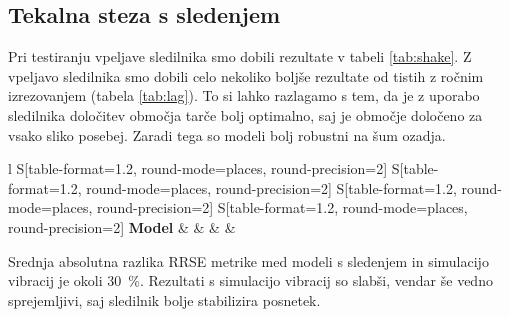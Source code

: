 \subsection{Tekalna steza s sledenjem}
Pri testiranju vpeljave sledilnika smo dobili rezultate v tabeli \ref{tab:shake}. Z vpeljavo sledilnika smo dobili celo nekoliko boljše rezultate od tistih z ročnim izrezovanjem (tabela \ref{tab:lag}). To si lahko razlagamo s tem, da je z uporabo sledilnika določitev območja tarče bolj optimalno, saj je območje določeno za vsako sliko posebej. Zaradi tega so modeli bolj robustni na šum ozadja.




\begin{table}[!htbp]
	\centering
	\begin{tabular}{l S[table-format=1.2, round-mode=places, round-precision=2] S[table-format=1.2, round-mode=places, round-precision=2] S[table-format=1.2, round-mode=places, round-precision=2] S[table-format=1.2, round-mode=places, round-precision=2]}
		\toprule
		\textbf{Model} &  &  &  &  \\
		\midrule
		\bottomrule
	\end{tabular}
	\caption[Rezultati tekalne steze s sledenjem]{Rezultati tekalne steze s sledenjem. Pri modelih s \textit{sh} kratico smo uporabili simulacijo vibracij. Modeli \textit{tr} so brez vibracij.}
	\label{tab:shake}
\end{table}


Srednja absolutna razlika RRSE metrike med modeli s sledenjem in simulacijo vibracij je okoli \SI{30}{\%}. Rezultati s simulacijo vibracij so slabši, vendar še vedno sprejemljivi, saj sledilnik bolje stabilizira posnetek.











